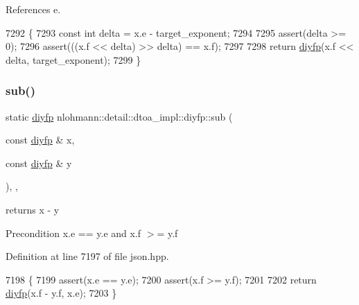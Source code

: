 References e.


\begin{DoxyCode}
7292     \{
7293         \textcolor{keyword}{const} \textcolor{keywordtype}{int} delta = x.e - target\_exponent;
7294 
7295         assert(delta >= 0);
7296         assert(((x.f << delta) >> delta) == x.f);
7297 
7298         \textcolor{keywordflow}{return} \hyperlink{structnlohmann_1_1detail_1_1dtoa__impl_1_1diyfp_a23d25b3ad4527270a6e3f2a0bcca11e6}{diyfp}(x.f << delta, target\_exponent);
7299     \}
\end{DoxyCode}
\mbox{\label{structnlohmann_1_1detail_1_1dtoa__impl_1_1diyfp_aeb26771af54ad73598c1a0430d65d884}} 
\subsubsection{\texorpdfstring{sub()}{sub()}}
{\footnotesize\ttfamily static \hyperlink{structnlohmann_1_1detail_1_1dtoa__impl_1_1diyfp}{diyfp} nlohmann\+::detail\+::dtoa\+\_\+impl\+::diyfp\+::sub (\begin{DoxyParamCaption}\item[{const \hyperlink{structnlohmann_1_1detail_1_1dtoa__impl_1_1diyfp}{diyfp} \&}]{x,  }\item[{const \hyperlink{structnlohmann_1_1detail_1_1dtoa__impl_1_1diyfp}{diyfp} \&}]{y }\end{DoxyParamCaption})\hspace{0.3cm}{\ttfamily [inline]}, {\ttfamily [static]}, {\ttfamily [noexcept]}}



returns x -\/ y 

\begin{DoxyPrecond}{Precondition}
x.\+e == y.\+e and x.\+f $>$= y.\+f 
\end{DoxyPrecond}


Definition at line 7197 of file json.\+hpp.


\begin{DoxyCode}
7198     \{
7199         assert(x.e == y.e);
7200         assert(x.f >= y.f);
7201 
7202         \textcolor{keywordflow}{return} \hyperlink{structnlohmann_1_1detail_1_1dtoa__impl_1_1diyfp_a23d25b3ad4527270a6e3f2a0bcca11e6}{diyfp}(x.f - y.f, x.e);
7203     \}
\end{DoxyCode}


